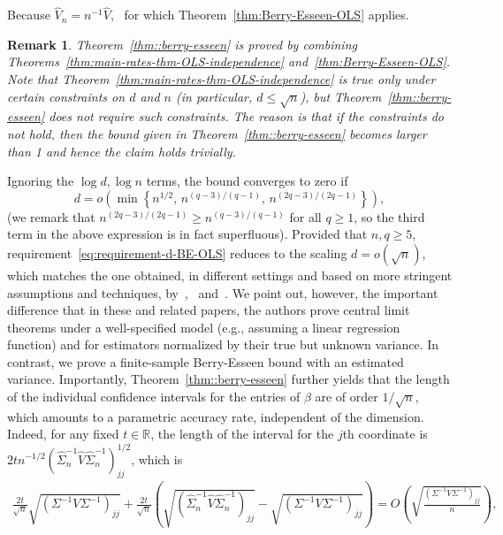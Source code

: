 \documentclass{article}
\newtheorem{remark}{Remark}
\begin{document}
Because $\widehat{V}_n = n^{-1}\widehat{V}$,
\ for which Theorem~\ref{thm:Berry-Esseen-OLS} applies.
\begin{remark}\label{rem:scaling-in-d}
Theorem~\ref{thm::berry-esseen} is proved by combining Theorems~\ref{thm:main-rates-thm-OLS-independence} and~\ref{thm:Berry-Esseen-OLS}. Note that Theorem~\ref{thm:main-rates-thm-OLS-independence} is true only under certain constraints on $d$ and $n$ (in particular, $d \le \sqrt{n}$), but Theorem~\ref{thm::berry-esseen} does not require such constraints. The reason is that if the constraints do not hold, then the bound given in Theorem~\ref{thm::berry-esseen} becomes larger than 1 and hence the claim holds trivially.
\end{remark}
Ignoring the $\log d, \log n$ terms, the bound converges to zero if
\begin{equation}\label{eq:requirement-d-BE-OLS}
d = o\left(\min\left\{n^{1/2},\, n^{(q-3)/(q-1)},\, n^{(2q-3)/(2q-1)}\right\}\right),
\end{equation}
(we remark that $n^{(2q-3)/(2q-1)} \ge n^{(q-3)/(q-1)}$ for all $q\ge1$, so the third term in the above expression is in fact superfluous). Provided that $n, q \ge 5$, requirement~\eqref{eq:requirement-d-BE-OLS} reduces to the scaling $d = o(\sqrt{n})$, which matches the one obtained, in different settings and based on more stringent assumptions and techniques, by~\cite{Portnoy84,Portnoy85,Portnoy86,portnoy1987central,Portnoy88},~\cite{He2000} and~\cite{spokoiny2012parametric}. We point out, however, the important difference that in these and related papers, the authors prove central limit theorems under a well-specified model (e.g., assuming a linear regression function) and for
estimators normalized by their true but unknown variance. In contrast, we prove a finite-sample Berry-Esseen bound with an estimated variance.
Importantly,
Theorem~\ref{thm::berry-esseen} further yields that the length of the individual confidence intervals for the entries of $\beta$ are of order $1/\sqrt{n}$, which amounts to a parametric accuracy rate, independent of the dimension. Indeed, for any fixed $t \in \mathbb{R}$, the length of the interval for the $j$th coordinate is ${2tn^{-1/2}}(\widehat{\Sigma}_n^{-1}\widehat{V}\widehat{\Sigma}_n^{-1})_{jj}^{1/2}$, which is
\begin{align*}
\frac{2t}{\sqrt{n}} \sqrt{({\Sigma}^{-1}V{\Sigma}^{-1})_{jj}}
+ \frac{2t}{\sqrt{n}} \left( \sqrt{(\widehat{\Sigma}_n^{-1}\widehat{V}\widehat{\Sigma}_n^{-1})_{jj}} - \sqrt{({\Sigma}^{-1}V{\Sigma}^{-1})_{jj}}
\right) = O \left( \sqrt{\frac{({\Sigma}^{-1}V{\Sigma}^{-1})_{jj}}{n}} \right),
\end{align*}
\end{document}
